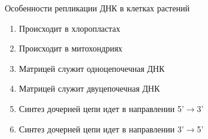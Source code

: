 
Особенности репликации ДНК в клетках
растений

\begin{enumerate}
    \item Происходит в хлоропластах 
    \item Происходит в митохондриях 
    \item Матрицей служит одноцепочечная ДНК 
    \item Матрицей служит двуцепочечная ДНК 
    \item Синтез дочерней цепи идет в направлении 5’$\rightarrow$3’
    \item Синтез дочерней цепи идет в направлении 3’$\rightarrow$5’
\end{enumerate}

